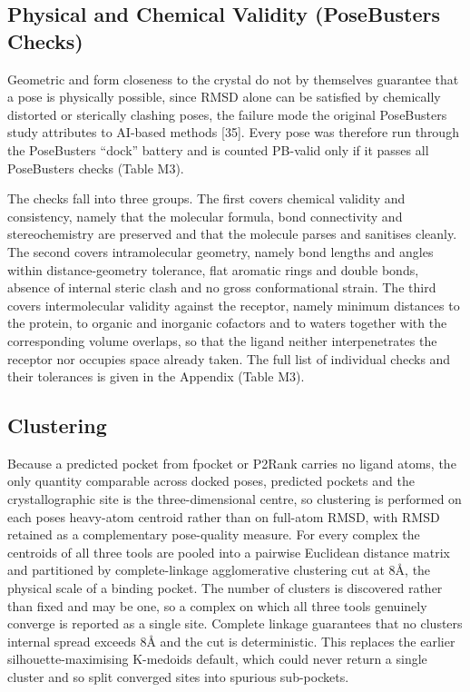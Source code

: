 \hypertarget{physical-and-chemical-validity-posebusters-checks}{%
\subsection{Physical and Chemical Validity (PoseBusters Checks)}\label{physical-and-chemical-validity-posebusters-checks}}

Geometric and form closeness to the crystal do not by themselves guarantee that a pose is physically possible, since RMSD alone can be satisfied by chemically distorted or sterically clashing poses, the failure mode the original PoseBusters study attributes to AI-based methods {[}35{]}. Every pose was therefore run through the PoseBusters ``dock'' battery and is counted PB-valid only if it passes all PoseBusters checks (Table M3).

The checks fall into three groups. The first covers chemical validity and consistency, namely that the molecular formula, bond connectivity and stereochemistry are preserved and that the molecule parses and sanitises cleanly. The second covers intramolecular geometry, namely bond lengths and angles within distance-geometry tolerance, flat aromatic rings and double bonds, absence of internal steric clash and no gross conformational strain. The third covers intermolecular validity against the receptor, namely minimum distances to the protein, to organic and inorganic cofactors and to waters together with the corresponding volume overlaps, so that the ligand neither interpenetrates the receptor nor occupies space already taken. The full list of individual checks and their tolerances is given in the Appendix (Table M3).

\hypertarget{clustering}{%
\subsection{Clustering}\label{clustering}}

Because a predicted pocket from fpocket or P2Rank carries no ligand atoms, the only quantity comparable across docked poses, predicted pockets and the crystallographic site is the three-dimensional centre, so clustering is performed on each pose\textquotesingle s heavy-atom centroid rather than on full-atom RMSD, with RMSD retained as a complementary pose-quality measure. For every complex the centroids of all three tools are pooled into a pairwise Euclidean distance matrix and partitioned by complete-linkage agglomerative clustering cut at 8Å, the physical scale of a binding pocket. The number of clusters is discovered rather than fixed and may be one, so a complex on which all three tools genuinely converge is reported as a single site. Complete linkage guarantees that no cluster\textquotesingle s internal spread exceeds 8Å and the cut is deterministic. This replaces the earlier silhouette-maximising K-medoids default, which could never return a single cluster and so split converged sites into spurious sub-pockets.

